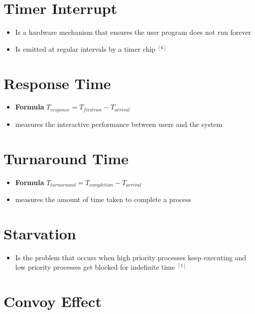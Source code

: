 \documentclass[12pt]{article}
\begin{document}
\section{Timer Interrupt}

\begin{itemize}
    \item Is a hardware mechanism that ensures the user program does not run forever
    \item Is emitted at regular intervals by a timer chip $^{[6]}$
\end{itemize}

\section{Response Time}
\begin{itemize}
    \item \textbf{Formula} $T_{response} = T_{firstrun} - T_{arrival}$
    \item measures the interactive performance between users and the system
\end{itemize}

\section{Turnaround Time}

\begin{itemize}
    \item \textbf{Formula} $T_{turnaround} = T_{completion} - T_{arrival}$
    \item measures the amount of time taken to complete a process
\end{itemize}

\section{Starvation}

\begin{itemize}
    \item Is the problem that occurs when high priority processes keep
    executing and low priority processes get blocked for indefinite time $^{[1]}$
\end{itemize}

\section{Convoy Effect}
\end{document}
